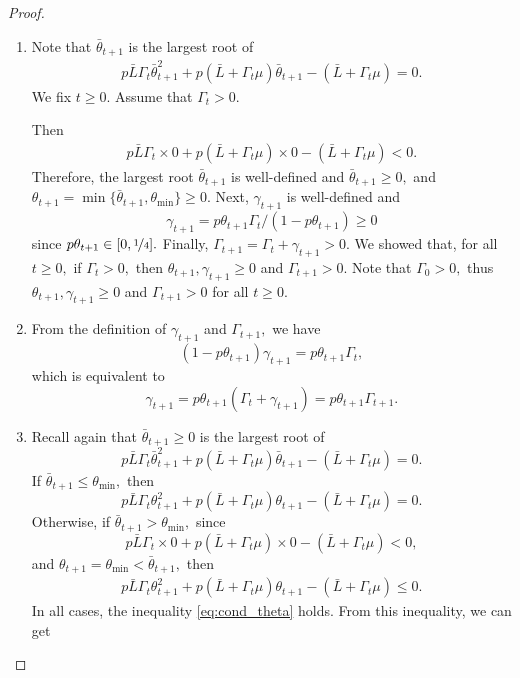 \documentclass{article} %
\theoremstyle{plain}
\theoremstyle{definition}
\theoremstyle{remark}
\begin{document}
\begin{proof}
  \hfill
  \begin{enumerate}
  \item 
  Note that $\bar{\theta}_{t+1}$ is the largest root of
  \begin{align}
    \label{eq:quad}
    p \bar{L} \Gamma_t \bar{\theta}^2_{t+1} + p (\bar{L} + \Gamma_t \mu) \bar{\theta}_{t+1} - (\bar{L} + \Gamma_t \mu) = 0.
  \end{align} 
  We fix $t \geq 0.$ Assume that $\Gamma_t > 0.$
  
  Then
  \begin{align*}
    p \bar{L} \Gamma_t \times 0 + p (\bar{L} + \Gamma_t \mu) \times 0 - (\bar{L} + \Gamma_t \mu) < 0.
  \end{align*}
  Therefore, the largest root $\bar{\theta}_{t+1}$ is well-defined and $\bar{\theta}_{t+1} \geq 0,$ and $\theta_{t+1} = \min\{\bar{\theta}_{t+1}, \theta_{\min}\} \geq 0.$ Next, $\gamma_{t+1}$ is well-defined and
  $$\gamma_{t+1} = p \theta_{t+1} \Gamma_t / (1 - p \theta_{t+1}) \geq 0$$ since $p \theta_{t+1} \in [0, \nicefrac{1}{4}].$ Finally, $\Gamma_{t+1} = \Gamma_{t} + \gamma_{t+1} > 0.$ 
  We showed that, for all $t \geq 0,$ if $\Gamma_t > 0,$ then $\theta_{t+1}, \gamma_{t+1} \geq 0$ and $\Gamma_{t+1} > 0.$ Note that $\Gamma_0 > 0,$ thus $\theta_{t+1}, \gamma_{t+1} \geq 0$ and $\Gamma_{t+1} > 0$ for all $t \geq 0.$
  \item
  From the definition of $\gamma_{t+1}$ and $\Gamma_{t+1},$ we have
  $$(1 - p \theta_{t+1}) \gamma_{t+1} = p \theta_{t+1} \Gamma_t,$$
  which is equivalent to
  $$\gamma_{t+1} = p \theta_{t+1} \left(\Gamma_t + \gamma_{t+1}\right) = p \theta_{t+1} \Gamma_{t+1}.$$
  \item
  Recall again that 
  $\bar{\theta}_{t+1} \geq 0$ is the largest root of
  $$p \bar{L} \Gamma_t \bar{\theta}^2_{t+1} + p (\bar{L} + \Gamma_t \mu) \bar{\theta}_{t+1} - (\bar{L} + \Gamma_t \mu) = 0.$$ 
  If $\bar{\theta}_{t+1} \leq \theta_{\min},$ then
  $$p \bar{L} \Gamma_t \theta^2_{t+1} + p (\bar{L} + \Gamma_t \mu) \theta_{t+1} - (\bar{L} + \Gamma_t \mu) = 0.$$ 
  Otherwise, if $\bar{\theta}_{t+1} > \theta_{\min},$ since
  $$p \bar{L} \Gamma_t \times 0 + p (\bar{L} + \Gamma_t \mu) \times 0 - (\bar{L} + \Gamma_t \mu) < 0,$$
  and $\theta_{t+1} = \theta_{\min} < \bar{\theta}_{t+1},$ then 
  \begin{align}p \bar{L} \Gamma_t \theta^2_{t+1} + p (\bar{L} + \Gamma_t \mu) \theta_{t+1} - (\bar{L} + \Gamma_t \mu) \leq 0.\label{eq:cond_theta}\end{align} In all cases, the inequality \eqref{eq:cond_theta} holds. From this inequality, we can get

\end{enumerate}
\end{proof}
\end{document}
